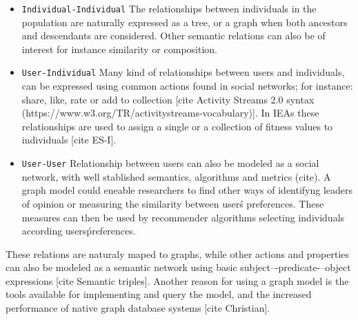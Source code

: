 \documentclass[conference]{IEEEtran}
\begin{document}
\begin{itemize}
  \item { \tt Individual-Individual} The relationships between individuals in the
  population are naturally expressed as a tree, or a graph when both ancestors 
  and descendants are considered. Other semantic relations can also be of interest
  for instance similarity or composition.

  \item {\tt User-Individual}
  Many kind of relationships between users and individuals,
  can be expressed using common actions found in social networks;
  for instance: share, like, rate or add to collection [cite Activity Streams 2.0
  syntax (https://www.w3.org/TR/activitystreams-vocabulary)]. In IEAs these
  relationships are used to assign a single or a collection of
  fitness values to individuals [cite ES-I].   

  \item {\tt User-User}
  Relationship between users can also be modeled 
  as a social network, with well stablished semantics, algorithms and metrics (cite).
  A graph model could eneable researchers to find other ways of identifyng leaders of 
  opinion or measuring the similarity between user\'s preferences. 
  These measures can then be used by recommender algorithms selecting 
  individuals according users\' preferences. 

\end{itemize}

These relations are naturaly maped to graphs, while other actions and 
properties can also be modeled as a semantic network using
basic subject–-predicate-–object expressions [cite Semantic triples].
Another reason for using a graph model is the tools available for
implementing and query the model, and the increased performance of
native graph database systems [cite Christian].






 
\end{document}
